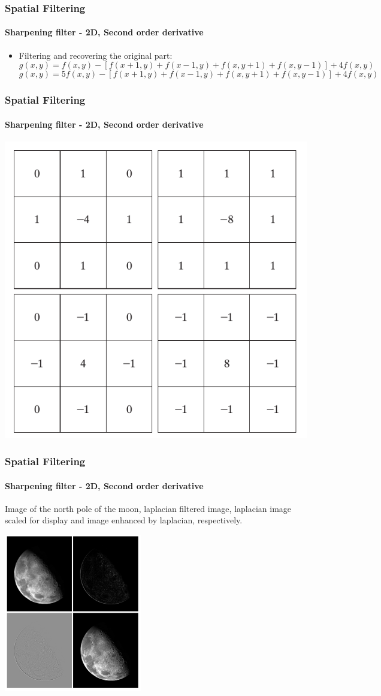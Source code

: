 \documentclass{beamer}
\begin{document}
\begin{frame}
\frametitle{Spatial Filtering}
\framesubtitle{Sharpening filter - 2D, Second order derivative}
\begin{itemize}
\item Filtering and recovering the original part: 
\scriptsize{
$$ g(x,y) = f(x,y) - [f(x+1,y)+f(x-1,y)+f(x,y+1)+f(x,y-1)]+4f(x,y)$$
$$ g(x,y) = 5f(x,y) - [f(x+1,y)+f(x-1,y)+f(x,y+1)+f(x,y-1)]+4f(x,y)$$
}
\end{itemize}
\end{frame}
\begin{frame}
\frametitle{Spatial Filtering}
\framesubtitle{Sharpening filter - 2D, Second order derivative}
\begin{center}\includegraphics[scale=0.3]{images/Spatial7-laplacian.png}\end{center}
\end{frame}
\begin{frame}
\frametitle{Spatial Filtering}
\framesubtitle{Sharpening filter - 2D, Second order derivative}
Image of the north pole of the moon, laplacian filtered image, laplacian image scaled for display and image enhanced by laplacian, respectively.
\begin{center}
\includegraphics[width = 0.45\textwidth, height = 0.6\textheight]{images/Spatial8-laplacian-ex.png} 
\end{center}
\end{frame}
\end{document}
